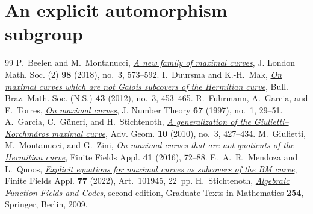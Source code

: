\documentclass[10pt,a4paper]{amsart}
\numberwithin{equation}{section}
\begin{document}
\section{An explicit automorphism subgroup}
\label{b1:automorphisms-section}


\begin{thebibliography}{99}
 P.~Beelen and M.~Montanucci, \href{https://doi.org/10.1112/jlms.12144}{\emph{A new family of maximal curves}}, J. London Math. Soc. (2) \textbf{98} (2018), no.~3, 573--592.
 I.~Duursma and K.-H.~Mak, \href{https://doi.org/10.1007/s00574-012-0022-2}{\emph{On maximal curves which are not Galois subcovers of the Hermitian curve}}, Bull. Braz. Math. Soc. (N.S.) \textbf{43} (2012), no.~3, 453--465.
 R.~Fuhrmann, A.~Garcia, and F.~Torres, \href{https://arxiv.org/abs/alg-geom/9610023}{\emph{On maximal curves}}, J. Number Theory \textbf{67} (1997), no.~1, 29--51.
 A.~Garcia, C.~G\"uneri, and H.~Stichtenoth, \href{https://doi.org/10.1515/ADVGEOM.2010.020}{\emph{A generalization of the Giulietti--Korchm\'aros maximal curve}}, Adv. Geom. \textbf{10} (2010), no.~3, 427--434.
 M.~Giulietti, M.~Montanucci, and G.~Zini, \href{https://doi.org/10.1016/j.ffa.2016.05.005}{\emph{On maximal curves that are not quotients of the Hermitian curve}}, Finite Fields Appl. \textbf{41} (2016), 72--88.
 E.~A.~R.~Mendoza and L.~Quoos, \href{https://doi.org/10.1016/j.ffa.2021.101945}{\emph{Explicit equations for maximal curves as subcovers of the BM curve}}, Finite Fields Appl. \textbf{77} (2022), Art.~101945, 22~pp.
 H.~Stichtenoth, \href{https://doi.org/10.1007/978-3-540-76878-4}{\emph{Algebraic Function Fields and Codes}}, second edition, Graduate Texts in Mathematics \textbf{254}, Springer, Berlin, 2009.
\end{thebibliography}
\end{document}
